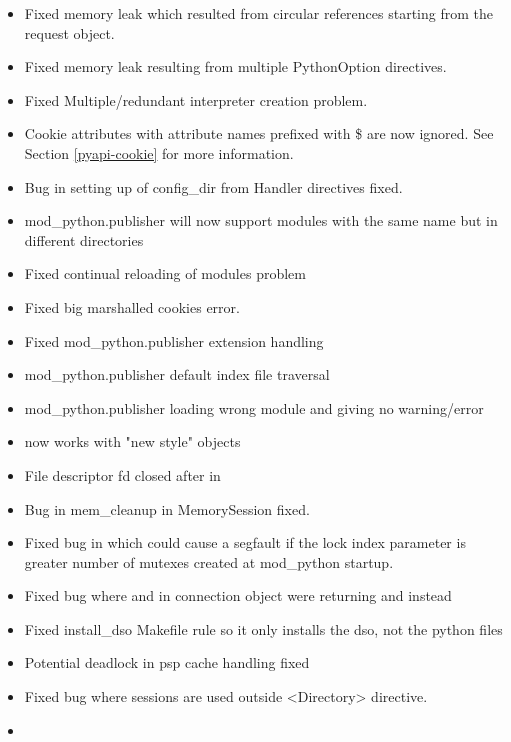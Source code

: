   \begin{itemize}
    \item
      Fixed memory leak which resulted from circular references starting 
      from the request object.
    \item
      Fixed memory leak resulting from multiple PythonOption directives. 
    \item
      Fixed Multiple/redundant interpreter creation problem.
    \item
      Cookie attributes  with attribute names prefixed with 
      \$ are now ignored. See Section \ref{pyapi-cookie} for more 
      information.
    \item
      Bug in setting up of config_dir from Handler directives fixed.
    \item
      mod_python.publisher will now support modules with the same name
      but in different directories
    \item
      Fixed continual reloading of modules problem
    \item
      Fixed big marshalled cookies error.
    \item
      Fixed mod_python.publisher extension handling
    \item
      mod_python.publisher default index file traversal
    \item
      mod_python.publisher loading wrong module and giving no
      warning/error
    \item
       now works with "new style" objects
    \item
      File descriptor fd closed after  in 
    \item
      Bug in mem_cleanup in MemorySession fixed.
    \item
      Fixed bug in  which could cause a segfault 
      if the lock index parameter is greater number of mutexes created
      at mod_python startup.
    \item
      Fixed bug where  and  in connection object 
      were returning  and  instead
    \item
      Fixed install_dso Makefile rule so it only installs the dso, not the
      python files
    \item
      Potential deadlock in psp cache handling fixed
    \item
      Fixed bug where sessions are used outside <Directory> directive.
    \item 

\end{itemize}
